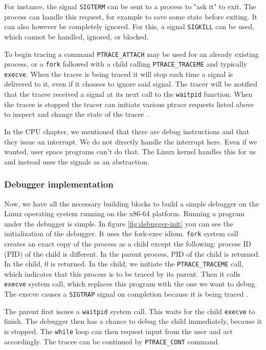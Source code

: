 For instance, the signal \texttt{SIGTERM} can be sent to a process to "ask it"
to exit. The process can handle this request, for example to save some state
before exiting. It can also however be completely ignored. For this, a signal
\texttt{SIGKILL} can be used, which cannot be handled, ignored, or blocked.

To begin tracing a command \texttt{PTRACE\_ATTACH} may be used for an already
existing process, or a \texttt{fork} followed with a child calling
\texttt{PTRACE\_TRACEME} and typically \texttt{execve}. When the tracee is
being traced it will stop each time a signal is delivered to it, even if it
chooses to ignore said signal. The tracer will be notified that the tracee
received a signal at its next call to the \texttt{waitpid} function. When the
tracee is stopped the tracer can initiate various ptrace requests listed above
to inspect and change the state of the tracee \cite{ptrace}.

In the CPU chapter, we mentioned that there are debug instructions and that
they issue an interrupt. We do not directly handle the interrupt here. Even if
we wanted, user space programs can't do that. The Linux kernel handles this for
us and instead uses the signals as an abstraction. 

\subsubsection{Debugger implementation}
Now, we have all the necessary building blocks to build a simple debugger on
the Linux operating system running on the x86-64 platform. Running a program
under the debugger is simple. In figure \ref{fig:debugger-init} you can see the
initialization of the debugger. It uses the fork-exec idiom. \texttt{fork}
system call creates an exact copy of the process as a child except the
following: process ID (PID) of the child is different. In the parent process,
PID of the child is returned. In the child, $0$ is returned. In the child, we
initiate the \texttt{PTRACE\_TRACEME} call, which indicates that this process
is to be traced by its parent. Then it calls \texttt{execve} system call, which
replaces this program with the one we want to debug. The execve causes a
\texttt{SIGTRAP} signal on completion because it is being traced \cite{execve}.

The parent first issues a \texttt{waitpid} system call. This waits for the
child \texttt{execve} to finish. The debugger then has a chance to debug the
child immediately, because it is stopped. The \texttt{while} loop can then
request input from the user and act accordingly. The tracee can be continued by
\texttt{PTRACE\_CONT} command.


